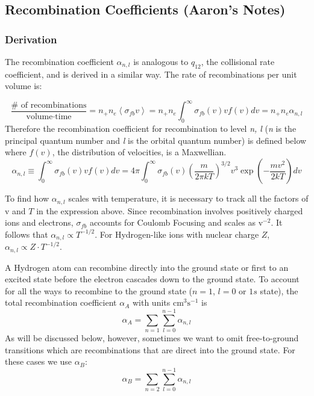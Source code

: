 \documentclass{article}
\def\mean#1{\left\langle {#1}\right\rangle}
\begin{document}
\subsection{Recombination Coefficients (Aaron's Notes)}

\subsubsection{Derivation}

\def\sigbf{\sigma_{bf}}
\def\alphaNL{\alpha_{n,l}}
\def\sigfb{\sigma_{fb}}

The recombination coefficient $\alphaNL$ is analogous to $q_{12}$, the collisional rate coefficient, and is derived in a similar way. The rate of recombinations per unit volume is:

$$\frac{\textrm{\#\ of\ recombinations}}{ \textrm{volume} \cdot \textrm{time} }= n_+n_e\mean{\sigfb v} = n_+n_e\int_0^{\infty}\sigfb(v)v f(v)dv = n_+n_e \alphaNL$$
Therefore the recombination coefficient for recombination to level \emph{n, l} (\emph{n} is the principal quantum number and \emph{l} is the orbital quantum number) is defined below where $f(v)$, the distribution of velocities, is a Maxwellian.  
$$\alphaNL \equiv \int_0^{\infty}\sigfb(v)v f(v)dv = 4\pi \int_0^{\infty}\sigfb(v) \left(\frac{m}{ 2 \pi kT} \right)^{3/2} v^3 \exp\left(-\frac{mv^2}{2kT}\right) dv$$

To find how $\alphaNL$ scales with temperature, it is necessary to track all the factors of $\textrm{v}$ and $T$ in the expression above. Since recombination involves positively charged ions and electrons, $\sigfb$ accounts for Coulomb Focusing and scales as $\textrm{v}^{-2}$. It follows that $\alphaNL \propto T^{-1/2}$. For Hydrogen-like ions with nuclear charge $Z$, $\alphaNL \propto Z \cdot T^{-1/2}$.

A Hydrogen atom can recombine directly into the ground state or first to an excited state before the electron cascades down to the ground state. To account for all the ways to recombine to the ground state ($n=1$, $l=0$ or $1s$ state), the total recombination coefficient $\alpha_A$ with units $\textrm{cm}^3 \textrm{s}^{-1}$ is
$$ \alpha_A = \sum_{n=1} \sum_{l=0}^{n-1} \alphaNL$$
As will be discussed below, however, sometimes we want to omit free-to-ground transitions which are recombinations that are direct into the ground state. For these cases we use $\alpha_B$:
$$ \alpha_B = \sum_{n=2} \sum_{l=0}^{n-1} \alphaNL$$
\end{document}
